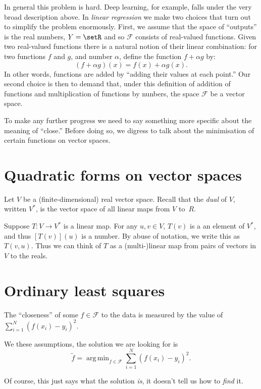 \documentclass[10pt, a4paper]{article}
\DeclareMathOperator*{\argmin}{arg\,min}
\begin{document}
In general this problem is hard. Deep learning, for example, falls
under the very broad description above. In \emph{linear regression} we
make two choices that turn out to simplify the problem enormously.
First, we assume that the space of “outputs” is the real numbers, $Y =
\setR$ and so $\mathcal{F}$ consists of real-valued functions. Given two
real-valued functions there is a natural notion of their linear
combination: for two functions $f$ and $g$, and number $\alpha$, define the
function $f+\alpha g$ by:
\begin{equation*}
  (f+\alpha g)(x) = f(x) + \alpha g(x).
\end{equation*}
In other words, functions are added by “adding their values at each
point.” Our second choice is then to demand that, under this
definition of addition of functions and multiplication of functions by
nunbers, the space $\mathcal{F}$ be a vector space.

To make any further progress we need to say something more specific
about the meaning of “close.” Before doing so, we digress to talk
about the minimisation of certain functions on vector spaces.

\section{Quadratic forms on vector spaces}

Let $V$ be a (finite-dimensional) real vector space. Recall that the
\emph{dual} of $V$, written $V^*$, is the vector space of all linear
maps from $V$ to~$R$. 

Suppose $T\colon V\to V^*$ is a linear map. For any $u, v\in V$, $T(v)$
is a an element of $V^*$, and thus $[T(v)](u)$ is a number. By abuse
of notation, we write this as $T(v,u)$. Thus we can think of $T$ as a
(multi-)linear map from pairs of vectors in $V$ to the reals.




\section{Ordinary least squares}



The “closeness” of some $f\in\mathcal{F}$ to the data is measured by the
  value of $\sum_{i=1}^N{(f(x_i) - y_i)}^2$.


We these assumptions, the solution we are looking for is
\begin{equation*}
  \tilde{f} = \argmin_{f\in\mathcal{F}} \sum_{i=1}^N {(f(x_i) - y_i)}^2.
\end{equation*}

Of course, this just says what the solution \emph{is}, it doesn't tell
us how to \emph{find} it.
\end{document}
